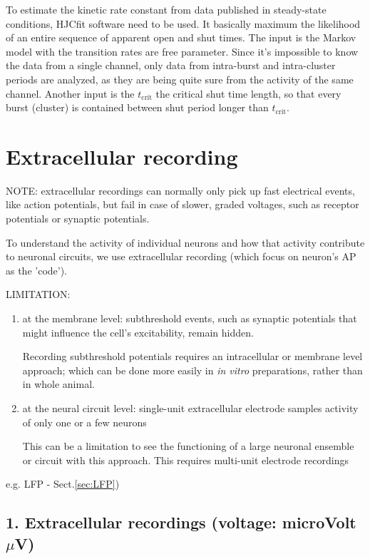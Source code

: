 To estimate the kinetic rate constant from data published in steady-state
conditions, HJCfit software need to be used. It basically maximum the likelihood
of an entire sequence of apparent open and shut times. The input is the Markov
model with the transition rates are free parameter. Since it's impossible to
know the data from a single channel, only data from intra-burst and
intra-cluster periods are analyzed, as they are being quite sure from the
activity of the same channel. Another input is the $t_\text{crit}$ the
critical shut time length, so that every burst (cluster) is contained between
shut period longer than $t_\text{crit}$.



\chapter{Extracellular recording}
\label{chap:extracellular-recording}

NOTE: extracellular recordings can normally only pick up fast electrical events,
like action potentials, but fail in case of slower, graded voltages, such as
receptor potentials or synaptic potentials.

To understand the activity of individual neurons and how that activity 
contribute to neuronal circuits, we use extracellular recording (which focus on
neuron's AP as the 'code').

LIMITATION:
\begin{enumerate}
  \item  at the membrane level: subthreshold events, such as synaptic potentials
  that might influence the cell's excitability, remain hidden.

Recording subthreshold potentials requires an intracellular or membrane level
approach; which can be done more easily in {\it in vitro} preparations, rather
than in whole animal.

  \item at the neural circuit level: single-unit extracellular
  electrode samples activity of only one or a few neurons

This can be a limitation to see the functioning of a large neuronal ensemble or
circuit with this approach. This requires multi-unit electrode recordings
  
\end{enumerate} 


e.g.
  LFP - Sect.\ref{sec:LFP})

\section{1. Extracellular recordings (voltage: microVolt $\mu$V)}
\label{sec:extracellular-recording}

